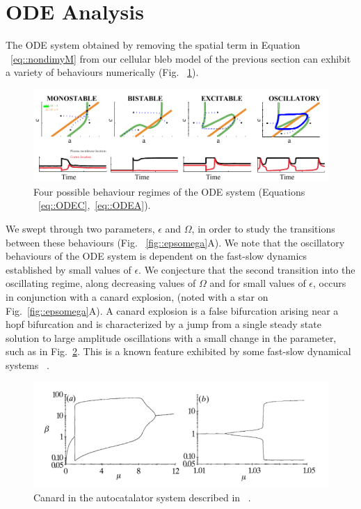 \section{ODE Analysis}

The ODE system obtained by removing the spatial term in Equation ~\ref{eq::nondimyM} from our cellular bleb model of the previous section can exhibit a variety of behaviours numerically (Fig. ~\ref{fig::odeanal}). 
\begin{figure}[h]
\centering
\captionsetup{width=\linewidth}
\includegraphics[width=4.5in]{Project2/figs/ODE_Analysis.pdf}
\caption{Four possible behaviour regimes of the ODE system (Equations ~\ref{eq::ODEC},~\ref{eq::ODEA}).}
\label{fig::odeanal}
\end{figure}

We swept through two parameters, $\epsilon$ and $\Omega$, in order to study the transitions between these behaviours (Fig. ~\ref{fig::epsomega}A). We note that the oscillatory behaviours of the ODE system is dependent on the fast-slow dynamics established by small values of $\epsilon$. We conjecture that the second transition into the oscillating regime, along decreasing values of $\Omega$ and for small values of $\epsilon$, occurs in conjunction with a canard explosion, (noted with a star on Fig.~\ref{fig::epsomega}A). A canard explosion is a false bifurcation arising near a hopf bifurcation and is characterized by a jump from a single steady state solution to large amplitude oscillations with a small change in the parameter, such as in Fig.~\ref{fig::canard}. This is a known feature exhibited by some fast-slow dynamical systems ~\cite{Peng1991}.

\begin{figure}[h]
\centering
\captionsetup{width=\linewidth}
\includegraphics[width=4.5in]{Project2/figs/canardfrompaper.pdf}
\caption{Canard in the autocatalator system described in ~\cite{Peng1991}.}
\label{fig::canard}
\end{figure}



